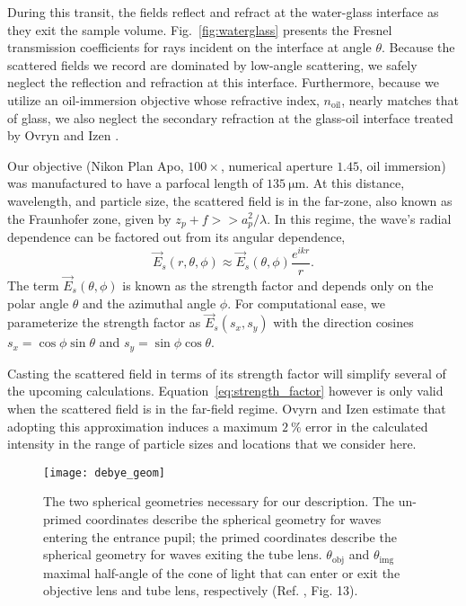 During this transit, the fields reflect and refract at the water-glass interface as they
exit the sample volume. Fig.~\ref{fig:waterglass} presents the Fresnel transmission
coefficients for rays incident on the interface at angle $\theta$.
Because the scattered fields we record are dominated by low-angle scattering,
we safely neglect the reflection and refraction at this interface. Furthermore,
because we utilize an
oil-immersion objective whose refractive index, $n_{\text{oil}}$,
nearly matches that of glass, we also neglect the secondary refraction at the
glass-oil interface treated by Ovryn and Izen \cite{izen00}.

Our objective  (Nikon Plan Apo, $\num{100}\times$, numerical aperture $\num{1.45}$,
oil immersion) was manufactured to have a parfocal length of $\SI{135}{\um}$.
At this distance, wavelength, and particle size, the scattered field is in the far-zone,
also known as the Fraunhofer zone, given by $z_p + f >> a_p^2/\lambda$. In this
regime, the wave's radial dependence can be factored out from its angular dependence,
\begin{equation}
  \label{eq:strength_factor}
  \vec{E}_s(r, \theta, \phi) \approx  \vec{E}_s(\theta, \phi) \frac{e^{ikr}}{r}.
\end{equation}
The term $\vec{E}_s(\theta, \phi)$ is known as the strength factor and
depends only on the polar angle $\theta$ and the azimuthal angle $\phi$.
For computational ease, we parameterize the strength factor as $\vec{E}_s(s_x, s_y)$
with the direction cosines $s_x=\cos{\phi}\sin{\theta}$ and $s_y = \sin{\phi}\cos{\theta}$.

Casting the scattered field in terms of its strength factor will simplify
several of the upcoming calculations. Equation~\eqref{eq:strength_factor} however
is only valid when the scattered field is in the far-field regime.
Ovyrn and Izen\cite{izen00} estimate that adopting this approximation induces a maximum
$\SI{2}{\percent}$ error in the calculated intensity in the range of particle
sizes and locations that we consider here.

\begin{figure}
  \centering
  \texttt{[image: debye\_geom]}
  \caption{The two spherical geometries necessary for our description. The un-primed coordinates
    describe the spherical geometry for waves entering the entrance pupil; the primed coordinates
    describe the spherical geometry for waves exiting the tube lens. $\theta_{\text{obj}}$ and
    $\theta_{\text{img}}$ maximal half-angle of the cone of light that can enter or exit
    the objective lens and tube lens, respectively (Ref. \cite{capoglu12}, Fig. 13).}
  \label{fig:debye_geom}
\end{figure}

